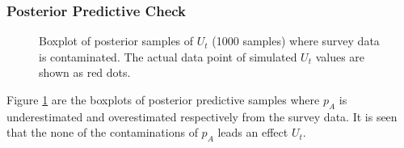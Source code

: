 \documentclass[]{article}
\begin{document}
\subsubsection{Posterior Predictive Check}

\begin{figure}[htb]
	\centering
	\caption[two early result box plots:ut]{Boxplot of posterior samples of $U_t$ (1000 samples) where survey data is contaminated.  The actual data point of simulated $U_t$ values are shown as red dots.}
	\label{contam_ut}
\end{figure}


Figure \ref{contam_ut} are the boxplots of posterior predictive samples where $p_A$ is underestimated and overestimated respectively from the survey data. It is seen that the none of the contaminations of $p_A$ leads an effect  $U_t$.\\
\end{document}
